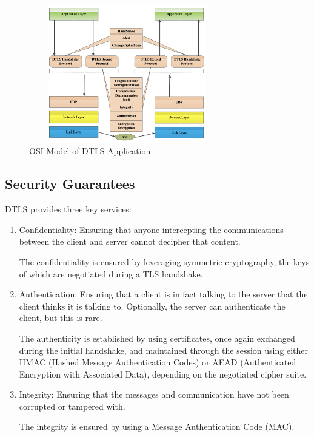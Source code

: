 \begin{figure}[H]
\centering
    \includegraphics[height=6cm,width=8.5cm]{figures/workMechanism(dtls).png}
    \caption{OSI Model of DTLS Application}
    \label{workMechanism(dtls)}
\end{figure}



\subsection{Security Guarantees}
DTLS provides three key services:
\begin{enumerate}
    \item Confidentiality: Ensuring that anyone intercepting the communications between the client and server cannot decipher that content. 
    
    The confidentiality is ensured by leveraging symmetric cryptography, the keys of which are negotiated during a TLS handshake.
    
    \item Authentication: Ensuring that a client is in fact talking to the server that the client thinks it is talking to. Optionally, the server can authenticate the client, but this is rare.
    
    The authenticity is established by using certificates, once again exchanged during the initial handshake, and maintained through the session using either \textsf{HMAC} (Hashed Message Authentication Codes) or AEAD (Authenticated Encryption with Associated Data), depending on the negotiated cipher suite.
    
    \item Integrity: Ensuring that the messages and communication have not been corrupted or tampered with.
  
  The integrity is ensured by using a Message Authentication Code (MAC).
\end{enumerate}

